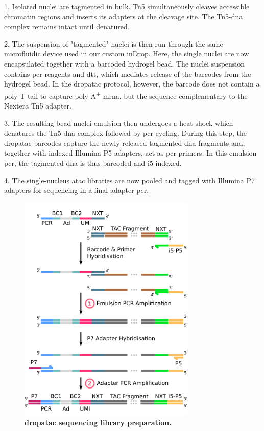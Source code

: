1. Isolated nuclei are tagmented in bulk. Tn5 simultaneously cleaves accessible chromatin regions and inserts its adapters at the cleavage site. The Tn5-\acrshort{dna} complex remains intact until denatured.\pms

2. The suspension of "tagmented" nuclei is then run through the same microfluidic device used in our custom inDrop. Here, the single nuclei are now encapsulated together with a barcoded hydrogel bead. The nuclei suspension contains \acrshort{pcr} reagents and \acrshort{dtt}, which mediates release of the barcodes from the hydrogel bead. In the \acrshort{dropatac} protocol, however, the barcode does not contain a poly-T tail to capture poly-A\textsuperscript{+} \acrshort{mrna}, but the sequence complementary to the Nextera Tn5 adapter.\pms

3. The resulting bead-nuclei emulsion then undergoes a heat shock which denatures the Tn5-\acrshort{dna} complex followed by \acrshort{pcr} cycling. During this step, the \acrshort{dropatac} barcodes capture the newly released tagmented \acrshort{dna} fragments and, together with indexed Illumina P5 adapters, act as \acrshort{pcr} primers. In this emulsion \acrshort{pcr}, the tagmented \acrshort{dna} is thus barcoded and i5 indexed.\pms

4. The single-nucleus \acrshort{atac} libraries are now pooled and tagged with Illumina P7 adapters for sequencing in a final adapter \acrshort{pcr}.\pms

\clearpage
\begin{figure}
\centering
\includegraphics[width=84.452mm]{./ims/dropatac_detail.png}
\caption[Drop-ATAC sequencing library preparation]{\textbf{\acrshort{dropatac} sequencing library preparation.}}
\label{fig:dropatac_detail}
\end{figure}

